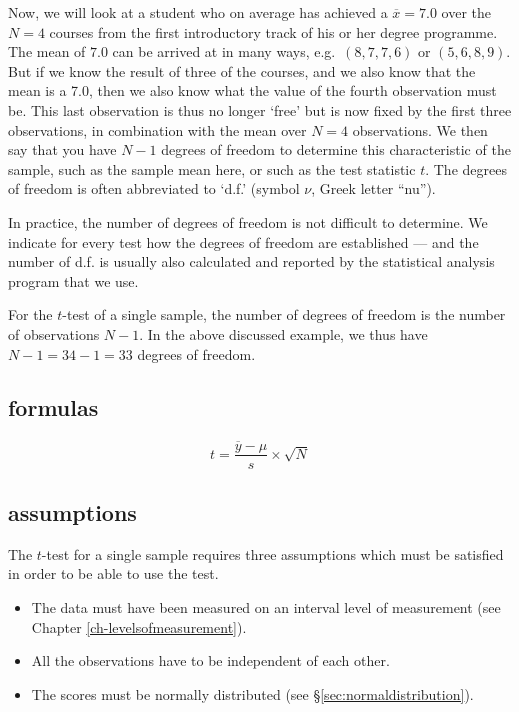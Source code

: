 \documentclass[
]{book}
\begin{document}
Now, we will look at a student who on average has achieved a \(\overline{x}=7.0\)
over the \(N=4\) courses from the first introductory track of his or her
degree programme. The mean of \(7.0\) can be arrived at in many ways,
e.g.~\((8,7,7,6)\) or \((5,6,8,9)\). But if we know the result of three of the courses,
and we also know that the mean is a 7.0, then we also know what the value
of the fourth observation must be. This last observation is thus no longer
`free' but is now fixed by the first three observations, in combination
with the mean over \(N=4\) observations. We then say that you have \(N-1\)
degrees of freedom to determine this characteristic of the sample, such as the sample mean here, or such as the test statistic \(t\).
The degrees of freedom is often abbreviated to `d.f.' (symbol \(\nu\), Greek letter ``nu'').

In practice, the number of degrees of freedom is not difficult to determine.
We indicate for every test how the degrees of freedom are established
--- and the number of d.f. is usually also calculated and reported by the
statistical analysis program that we use.

For the \(t\)-test of a single sample, the number of degrees of freedom is the
number of observations \(N-1\). In the above discussed example, we thus have
\(N-1 = 34-1 = 33\) degrees of freedom.

\subsection{formulas}\label{sec:formulas13-1}

\begin{equation}
  t = \frac{ \overline{y}-\mu} { s } \times \sqrt{N}
  \label{eq:t-onesample}
\end{equation}

\subsection{assumptions}\label{sec:ttest-assumptions}

The \(t\)-test for a single sample requires three assumptions which
must be satisfied in order to be able to use the test.

\begin{itemize}
\item
  The data must have been measured on an interval level of measurement (see
  Chapter \ref{ch-levelsofmeasurement}).
\item
  All the observations have to be independent of each other.
\item
  The scores must be normally distributed (see
  §\ref{sec:normaldistribution}).
\end{itemize}
\end{document}
